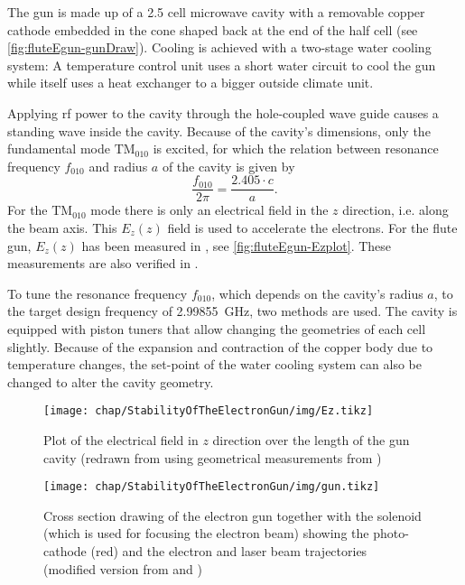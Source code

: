 The gun is made up of a 2.5 cell microwave cavity with a removable copper cathode embedded in the cone shaped back at the end of the half cell (see \autoref{fig:fluteEgun-gunDraw}). Cooling is achieved with a two-stage water cooling system: A temperature control unit uses a short water circuit to cool the gun while itself uses a heat exchanger to a bigger outside climate unit.

Applying \gls{rf} power to the cavity through the hole-coupled wave guide causes a standing wave inside the cavity. Because of the cavity's dimensions, only the fundamental mode $\text{TM}_{010}$ is excited, for which the relation between resonance frequency $f_{010}$ and radius $a$ of the cavity is given by
\begin{equation}
\frac{f_{010}}{2\pi}=\frac{2.405 \cdot c}{a}.
\end{equation}
For the $\text{TM}_{010}$ mode there is only an electrical field in the $z$ direction, i.e. along the beam axis. This $E_z(z)$ field is used to accelerate the electrons. For the \gls{flute} gun, $E_z(z)$ has been measured in \cite{Bossart:clic}, see \autoref{fig:fluteEgun-Ezplot}. These measurements are also verified in \cite{Schuh2014}.

To tune the resonance frequency $f_{010}$, which depends on the cavity's radius $a$, to the target design frequency of \SI{2.99855}{\GHz}, two methods are used. The cavity is equipped with piston tuners that allow changing the geometries of each cell slightly. Because of the expansion and contraction of the copper body due to temperature changes, the set-point of the water cooling system can also be changed to alter the cavity geometry.

\begin{figure}[tbh]
	\centering
	\texttt{[image: chap/StabilityOfTheElectronGun/img/Ez.tikz]}
	\caption[Plot of the electric field $E_z(z)$ in the electron gun]{Plot of the electrical field in $z$ direction over the length of the gun cavity (redrawn from \cite{Bossart:clic} using geometrical measurements from \cite{Hoeninger2014})}
	\label{fig:fluteEgun-Ezplot}
\end{figure}

\begin{figure}[tbh]
	\centering
	\texttt{[image: chap/StabilityOfTheElectronGun/img/gun.tikz]}
	\caption[Cross-section of the electron gun]{Cross section drawing of the electron gun together with the solenoid (which is used for focusing the electron beam) showing the photo-cathode (red) and the electron and laser beam trajectories
	\\(modified version from \cite{Bossart:clic} and \cite{Bossart:288412})}
	\label{fig:fluteEgun-gunDraw}
\end{figure}


